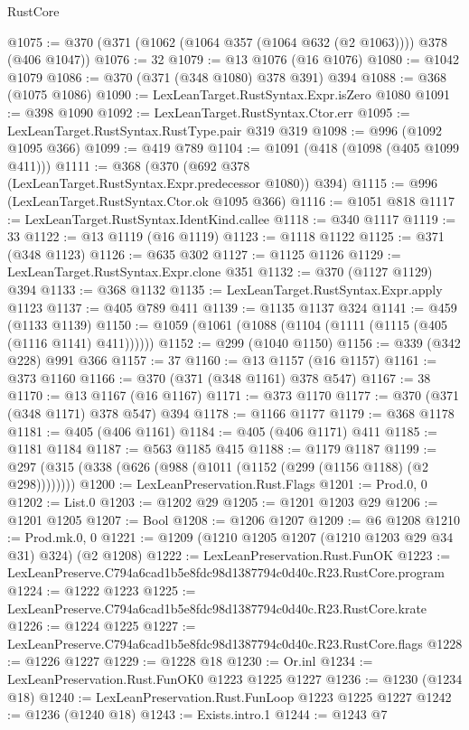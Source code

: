 \begin{lexlean}{RustCore}
\begin{coremodule}
@1075 := @370 (@371 (@1062 (@1064 @357 (@1064 @632 (@2 @1063)))) @378 (@406 @1047))
@1076 := 32
@1079 := @13 @1076 (@16 @1076)
@1080 := @1042 @1079
@1086 := @370 (@371 (@348 @1080) @378 @391) @394
@1088 := @368 (@1075 @1086)
@1090 := LexLeanTarget.RustSyntax.Expr.isZero @1080
@1091 := @398 @1090
@1092 := LexLeanTarget.RustSyntax.Ctor.err
@1095 := LexLeanTarget.RustSyntax.RustType.pair @319 @319
@1098 := @996 (@1092 @1095 @366)
@1099 := @419 @789
@1104 := @1091 (@418 (@1098 (@405 @1099 @411)))
@1111 := @368 (@370 (@692 @378 (LexLeanTarget.RustSyntax.Expr.predecessor @1080)) @394)
@1115 := @996 (LexLeanTarget.RustSyntax.Ctor.ok @1095 @366)
@1116 := @1051 @818
@1117 := LexLeanTarget.RustSyntax.IdentKind.callee
@1118 := @340 @1117
@1119 := 33
@1122 := @13 @1119 (@16 @1119)
@1123 := @1118 @1122
@1125 := @371 (@348 @1123)
@1126 := @635 @302
@1127 := @1125 @1126
@1129 := LexLeanTarget.RustSyntax.Expr.clone @351
@1132 := @370 (@1127 @1129) @394
@1133 := @368 @1132
@1135 := LexLeanTarget.RustSyntax.Expr.apply @1123
@1137 := @405 @789 @411
@1139 := @1135 @1137 @324
@1141 := @459 (@1133 @1139)
@1150 := @1059 (@1061 (@1088 (@1104 (@1111 (@1115 (@405 (@1116 @1141) @411))))))
@1152 := @299 (@1040 @1150)
@1156 := @339 (@342 @228) @991 @366
@1157 := 37
@1160 := @13 @1157 (@16 @1157)
@1161 := @373 @1160
@1166 := @370 (@371 (@348 @1161) @378 @547)
@1167 := 38
@1170 := @13 @1167 (@16 @1167)
@1171 := @373 @1170
@1177 := @370 (@371 (@348 @1171) @378 @547) @394
@1178 := @1166 @1177
@1179 := @368 @1178
@1181 := @405 (@406 @1161)
@1184 := @405 (@406 @1171) @411
@1185 := @1181 @1184
@1187 := @563 @1185 @415
@1188 := @1179 @1187
@1199 := @297 (@315 (@338 (@626 (@988 (@1011 (@1152 (@299 (@1156 @1188) (@2 @298))))))))
@1200 := LexLeanPreservation.Rust.Flags
@1201 := Prod.{0, 0}
@1202 := List.{0}
@1203 := @1202 @29
@1205 := @1201 @1203 @29
@1206 := @1201 @1205
@1207 := Bool
@1208 := @1206 @1207
@1209 := @6 @1208
@1210 := Prod.mk.{0, 0}
@1221 := @1209 (@1210 @1205 @1207 (@1210 @1203 @29 @34 @31) @324) (@2 @1208)
@1222 := LexLeanPreservation.Rust.FunOK
@1223 := LexLeanPreserve.C794a6cad1b5e8fdc98d1387794c0d40c.R23.RustCore.program
@1224 := @1222 @1223
@1225 := LexLeanPreserve.C794a6cad1b5e8fdc98d1387794c0d40c.R23.RustCore.krate
@1226 := @1224 @1225
@1227 := LexLeanPreserve.C794a6cad1b5e8fdc98d1387794c0d40c.R23.RustCore.flags
@1228 := @1226 @1227
@1229 := @1228 @18
@1230 := Or.inl
@1234 := LexLeanPreservation.Rust.FunOK0 @1223 @1225 @1227
@1236 := @1230 (@1234 @18)
@1240 := LexLeanPreservation.Rust.FunLoop @1223 @1225 @1227
@1242 := @1236 (@1240 @18)
@1243 := Exists.intro.{1}
@1244 := @1243 @7

\end{coremodule}
\end{lexlean}
